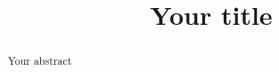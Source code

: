 \documentclass[a4paper]{report}
\title{Your title}
\begin{document}
\maketitle

\begin{abstract}
    Your abstract
\end{abstract}


\tableofcontents

% 

\nocite{*}
\printbibliography
\end{document}
